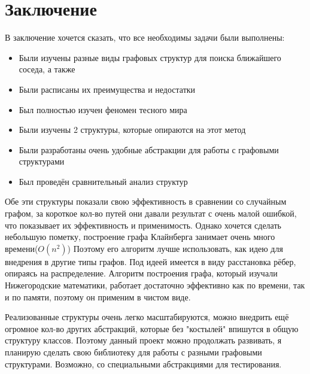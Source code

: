 \section{Заключение}

В заключение хочется сказать, что все необходимы задачи были выполнены:
\begin{itemize}
    \item Были изучены разные виды графовых структур для поиска ближайшего соседа, а 
    также 
    \item Были расписаны их преимущества и недостатки
    \item Был полностью изучен феномен тесного мира
    \item Были изучены 2 структуры, которые опираются на этот метод
    \item Были разработаны очень удобные абстракции для работы с графовыми структурами
    \item Был проведён сравнительный анализ структур
\end{itemize}

Обе эти структуры показали свою эффективность в сравнении со случайным графом, за короткое 
кол-во путей они давали результат с очень малой ошибкой, что показывает их эффективность
и применимость. Однако хочется сделать небольшую пометку, построение графа Клайнберга занимает очень
много времени($O(n^2)$) Поэтому его алгоритм лучше использовать, как идею для внедрения в другие типы графов. 
Под идеей имеется в виду расстановка рёбер, опираясь на распределение. Алгоритм построения графа,
который изучали Нижегородские математики, работает достаточно эффективно как по времени, так и по памяти,
поэтому он применим в чистом виде. 

Реализованные структуры очень легко масштабируются, можно внедрить ещё огромное кол-во других абстракций, которые
без "костылей" впишутся в общую структуру классов. Поэтому данный проект можно продолжать развивать,
я планирую сделать свою библиотеку для работы с разными графовыми структурами. Возможно, со
специальными абстракциями для тестирования.